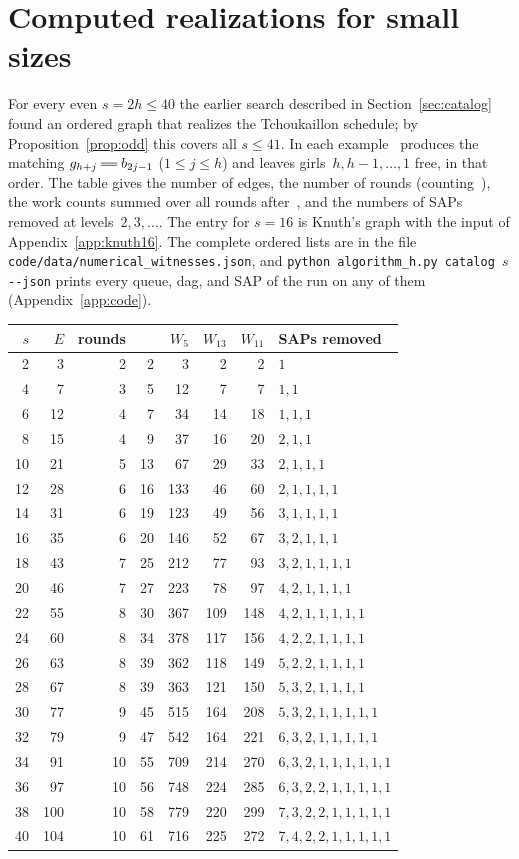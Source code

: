 \section{Computed realizations for small sizes}
\label{app:catalog}

For every even $s=2h\le40$ the earlier search described in
Section~\ref{sec:catalog} found an ordered graph that realizes the
Tchoukaillon schedule; by Proposition~\ref{prop:odd} this covers all
$s\le41$. In each example~ produces the matching
$g_{h+j}\db b_{2j-1}$ ($1\le j\le h$) and leaves girls~$h,h-1,\ldots,1$ free,
in that order. The table gives the number of edges, the number of rounds
(counting~), the work counts summed over all rounds after~, and the
numbers of SAPs removed at levels~$2,3,\ldots$. The entry for $s=16$ is
Knuth's graph with the input of Appendix~\ref{app:knuth16}. The complete
ordered lists are in the file \texttt{code/data/numerical\_witnesses.json},
and \texttt{python algorithm\_h.py catalog $s$ -{}-json} prints every queue,
dag, and SAP of the run on any of them (Appendix~\ref{app:code}).

\begin{center}\small
\setlength{\tabcolsep}{5pt}
\begin{tabular}{rrrrrrrl}
\toprule
$s$&$E$&rounds&\Hs1&$W_5$&$W_{13}$&$W_{11}$&SAPs removed\\
\midrule
2&3&2&2&3&2&2&$1$\\
4&7&3&5&12&7&7&$1,1$\\
6&12&4&7&34&14&18&$1,1,1$\\
8&15&4&9&37&16&20&$2,1,1$\\
10&21&5&13&67&29&33&$2,1,1,1$\\
12&28&6&16&133&46&60&$2,1,1,1,1$\\
14&31&6&19&123&49&56&$3,1,1,1,1$\\
16&35&6&20&146&52&67&$3,2,1,1,1$\\
18&43&7&25&212&77&93&$3,2,1,1,1,1$\\
20&46&7&27&223&78&97&$4,2,1,1,1,1$\\
22&55&8&30&367&109&148&$4,2,1,1,1,1,1$\\
24&60&8&34&378&117&156&$4,2,2,1,1,1,1$\\
26&63&8&39&362&118&149&$5,2,2,1,1,1,1$\\
28&67&8&39&363&121&150&$5,3,2,1,1,1,1$\\
30&77&9&45&515&164&208&$5,3,2,1,1,1,1,1$\\
32&79&9&47&542&164&221&$6,3,2,1,1,1,1,1$\\
34&91&10&55&709&214&270&$6,3,2,1,1,1,1,1,1$\\
36&97&10&56&748&224&285&$6,3,2,2,1,1,1,1,1$\\
38&100&10&58&779&220&299&$7,3,2,2,1,1,1,1,1$\\
40&104&10&61&716&225&272&$7,4,2,2,1,1,1,1,1$\\
\bottomrule
\end{tabular}
\end{center}

